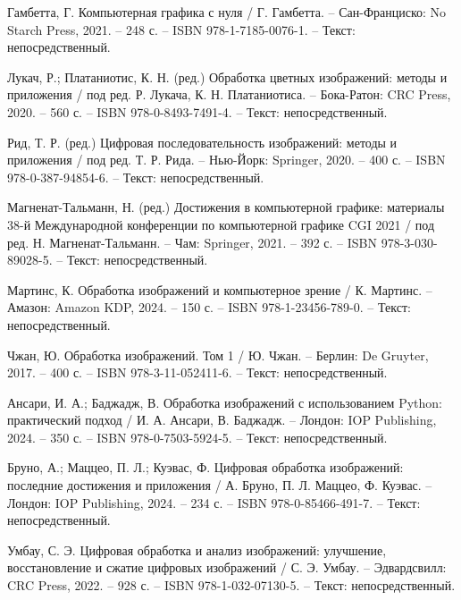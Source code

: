 
\begin{thebibliography}{9}

    Гамбетта, Г. Компьютерная графика с нуля / Г. Гамбетта. – Сан-Франциско: No Starch Press, 2021. – 248 с. – ISBN 978-1-7185-0076-1. – Текст: непосредственный.
    
    Лукач, Р.; Платаниотис, К. Н. (ред.) Обработка цветных изображений: методы и приложения / под ред. Р. Лукача, К. Н. Платаниотиса. – Бока-Ратон: CRC Press, 2020. – 560 с. – ISBN 978-0-8493-7491-4. – Текст: непосредственный.
    
    Рид, Т. Р. (ред.) Цифровая последовательность изображений: методы и приложения / под ред. Т. Р. Рида. – Нью-Йорк: Springer, 2020. – 400 с. – ISBN 978-0-387-94854-6. – Текст: непосредственный.
    
    Магненат-Тальманн, Н. (ред.) Достижения в компьютерной графике: материалы 38-й Международной конференции по компьютерной графике CGI 2021 / под ред. Н. Магненат-Тальманн. – Чам: Springer, 2021. – 392 с. – ISBN 978-3-030-89028-5. – Текст: непосредственный.
    
    Мартинс, К. Обработка изображений и компьютерное зрение / К. Мартинс. – Амазон: Amazon KDP, 2024. – 150 с. – ISBN 978-1-23456-789-0. – Текст: непосредственный.
    
    Чжан, Ю. Обработка изображений. Том 1 / Ю. Чжан. – Берлин: De Gruyter, 2017. – 400 с. – ISBN 978-3-11-052411-6. – Текст: непосредственный.
    
    Ансари, И. А.; Баджадж, В. Обработка изображений с использованием Python: практический подход / И. А. Ансари, В. Баджадж. – Лондон: IOP Publishing, 2024. – 350 с. – ISBN 978-0-7503-5924-5. – Текст: непосредственный.
    
    Бруно, А.; Маццео, П. Л.; Куэвас, Ф. Цифровая обработка изображений: последние достижения и приложения / А. Бруно, П. Л. Маццео, Ф. Куэвас. – Лондон: IOP Publishing, 2024. – 234 с. – ISBN 978-0-85466-491-7. – Текст: непосредственный.
    
    Умбау, С. Э. Цифровая обработка и анализ изображений: улучшение, восстановление и сжатие цифровых изображений / С. Э. Умбау. – Эдвардсвилл: CRC Press, 2022. – 928 с. – ISBN 978-1-032-07130-5. – Текст: непосредственный.
    

\end{thebibliography}
